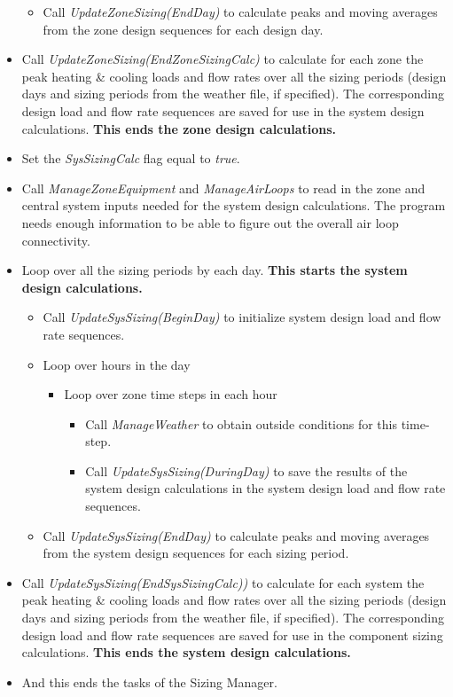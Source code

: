 \begin{itemize}
\begin{itemize}
\begin{itemize}
\begin{itemize}
            \end{itemize}
        \end{itemize}
      \item
        Call \emph{UpdateZoneSizing(EndDay)} to calculate peaks and moving averages from the zone design sequences for each design day.
    \end{itemize}
  \item
    Call \emph{UpdateZoneSizing(EndZoneSizingCalc)} to calculate for each zone the peak heating \& cooling loads and flow rates over all the sizing periods (design days and sizing periods from the weather file, if specified). The corresponding design load and flow rate sequences are saved for use in the system design calculations. \textbf{This ends the zone design calculations.}
  \item
    Set the \emph{SysSizingCalc} flag equal to \emph{true}.
  \item
    Call \emph{ManageZoneEquipment} and \emph{ManageAirLoops} to read in the zone and central system inputs needed for the system design calculations. The program needs enough information to be able to figure out the overall air loop connectivity.
  \item
    Loop over all the sizing periods by each day. \textbf{This starts the system design calculations.}
    \begin{itemize}
      \item
        Call \emph{UpdateSysSizing(BeginDay)} to initialize system design load and flow rate sequences.
      \item
        Loop over hours in the day
        \begin{itemize}
          \item
            Loop over zone time steps in each hour
            \begin{itemize}
              \item Call \emph{ManageWeather} to obtain outside conditions for this time-step.
              \item Call \emph{UpdateSysSizing(DuringDay)} to save the results of the system design calculations in the system design load and flow rate sequences.
            \end{itemize}
        \end{itemize}
      \item
        Call \emph{UpdateSysSizing(EndDay)} to calculate peaks and moving averages from the system design sequences for each sizing period.
    \end{itemize}
  \item
    Call \emph{UpdateSysSizing(EndSysSizingCalc))} to calculate for each system the peak heating \& cooling loads and flow rates over all the sizing periods (design days and sizing periods from the weather file, if specified). The corresponding design load and flow rate sequences are saved for use in the component sizing calculations. \textbf{This ends the system design calculations.}
  \item
    And this ends the tasks of the Sizing Manager.
\end{itemize}
